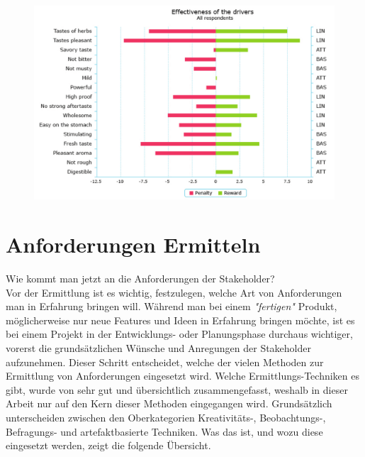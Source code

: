 \begin{figure}[!htb]
		\includegraphics[width=\textwidth]{images/penaltyreward.pdf}
\centering 
{} 
\label{fig:penaltyreward}
\end{figure}

\section{Anforderungen Ermitteln}
\label{subsec:ermittlung}
Wie kommt man jetzt an die Anforderungen der Stakeholder? \\
Vor der Ermittlung ist es wichtig, festzulegen, welche Art von Anforderungen man in Erfahrung bringen will. Während man bei einem \textit{"fertigen"} Produkt, möglicherweise nur neue Features und Ideen in Erfahrung bringen möchte, ist es bei einem Projekt in der Entwicklungs- oder Planungsphase durchaus wichtiger, vorerst die grundsätzlichen Wünsche und Anregungen der Stakeholder aufzunehmen. Dieser Schritt entscheidet, welche der vielen Methoden zur Ermittlung von Anforderungen eingesetzt wird. Welche Ermittlungs-Techniken es gibt, wurde von \cite{Rupp2} sehr gut und übersichtlich zusammengefasst, weshalb in dieser Arbeit nur auf den Kern dieser Methoden eingegangen wird. Grundsätzlich unterscheiden \cite{Rupp2} zwischen den Oberkategorien Kreativitäts-, Beobachtungs-, Befragungs- und artefaktbasierte Techniken. Was das ist, und wozu diese eingesetzt werden, zeigt die folgende Übersicht.

